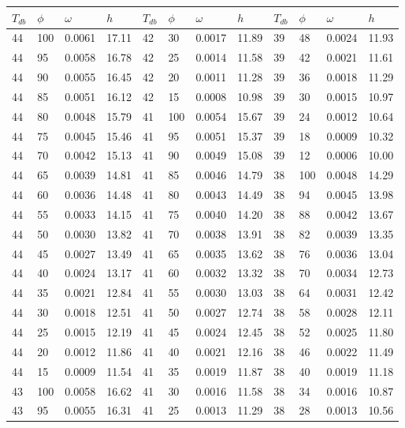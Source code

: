 \begin{tabular}{llll|llll|llll}
 \toprule 
\(T_{db}\) & \(\phi\) & \(\omega\) & \(h\) & \(T_{db}\) & \(\phi\) & \(\omega\) & \(h\) & \(T_{db}\) & \(\phi\) & \(\omega\) & \(h\)  \\ \midrule 
44 & 100 & 0.0061 & 17.11 & 42 & 30 & 0.0017 & 11.89 & 39 & 48 & 0.0024 & 11.93\\
44 & 95 & 0.0058 & 16.78 & 42 & 25 & 0.0014 & 11.58 & 39 & 42 & 0.0021 & 11.61\\
44 & 90 & 0.0055 & 16.45 & 42 & 20 & 0.0011 & 11.28 & 39 & 36 & 0.0018 & 11.29\\
44 & 85 & 0.0051 & 16.12 & 42 & 15 & 0.0008 & 10.98 & 39 & 30 & 0.0015 & 10.97\\
44 & 80 & 0.0048 & 15.79 & 41 & 100 & 0.0054 & 15.67 & 39 & 24 & 0.0012 & 10.64\\
44 & 75 & 0.0045 & 15.46 & 41 & 95 & 0.0051 & 15.37 & 39 & 18 & 0.0009 & 10.32\\
44 & 70 & 0.0042 & 15.13 & 41 & 90 & 0.0049 & 15.08 & 39 & 12 & 0.0006 & 10.00\\
44 & 65 & 0.0039 & 14.81 & 41 & 85 & 0.0046 & 14.79 & 38 & 100 & 0.0048 & 14.29\\
44 & 60 & 0.0036 & 14.48 & 41 & 80 & 0.0043 & 14.49 & 38 & 94 & 0.0045 & 13.98\\
44 & 55 & 0.0033 & 14.15 & 41 & 75 & 0.0040 & 14.20 & 38 & 88 & 0.0042 & 13.67\\
44 & 50 & 0.0030 & 13.82 & 41 & 70 & 0.0038 & 13.91 & 38 & 82 & 0.0039 & 13.35\\
44 & 45 & 0.0027 & 13.49 & 41 & 65 & 0.0035 & 13.62 & 38 & 76 & 0.0036 & 13.04\\
44 & 40 & 0.0024 & 13.17 & 41 & 60 & 0.0032 & 13.32 & 38 & 70 & 0.0034 & 12.73\\
44 & 35 & 0.0021 & 12.84 & 41 & 55 & 0.0030 & 13.03 & 38 & 64 & 0.0031 & 12.42\\
44 & 30 & 0.0018 & 12.51 & 41 & 50 & 0.0027 & 12.74 & 38 & 58 & 0.0028 & 12.11\\
44 & 25 & 0.0015 & 12.19 & 41 & 45 & 0.0024 & 12.45 & 38 & 52 & 0.0025 & 11.80\\
44 & 20 & 0.0012 & 11.86 & 41 & 40 & 0.0021 & 12.16 & 38 & 46 & 0.0022 & 11.49\\
44 & 15 & 0.0009 & 11.54 & 41 & 35 & 0.0019 & 11.87 & 38 & 40 & 0.0019 & 11.18\\
43 & 100 & 0.0058 & 16.62 & 41 & 30 & 0.0016 & 11.58 & 38 & 34 & 0.0016 & 10.87\\
43 & 95 & 0.0055 & 16.31 & 41 & 25 & 0.0013 & 11.29 & 38 & 28 & 0.0013 & 10.56\\

\end{tabular}
